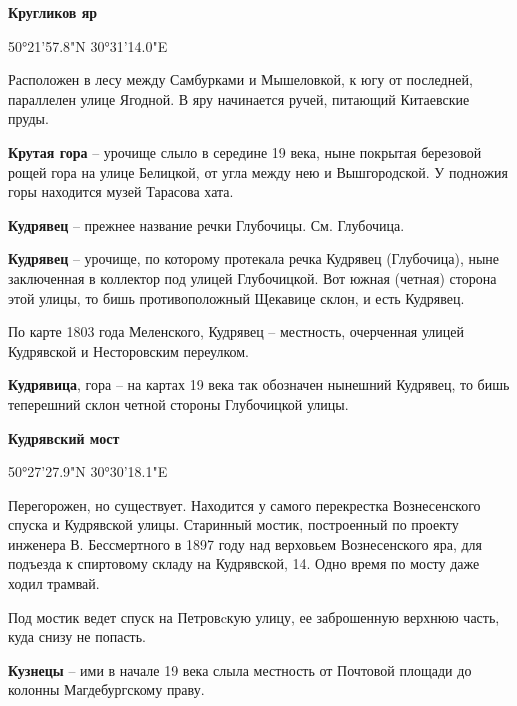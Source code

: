 \medskip

\textbf{Кругликов яр} 

50°21'57.8"N 30°31'14.0"E

Расположен в лесу между Самбурками и Мышеловкой, к югу от последней, параллелен улице Ягодной. В яру начинается ручей, питающий Китаевские пруды.\\

\medskip

\textbf{Крутая гора} – урочище слыло в середине 19 века, ныне покрытая березовой рощей гора на улице Белицкой, от угла между нею и Вышгородской. У подножия горы находится музей Тарасова хата.\\

\medskip

\textbf{Кудрявец} – прежнее название речки Глубочицы. См. Глубочица.\\


\medskip

\textbf{Кудрявец} – урочище, по которому протекала речка Кудрявец (Глубочица), ныне заключенная в коллектор под улицей Глубочицкой. Вот южная (четная) сторона этой улицы, то бишь противоположный Щекавице склон, и есть Кудрявец.

По карте 1803 года Меленского, Кудрявец – местность, очерченная улицей Кудрявской и Несторовским переулком.\\

\medskip

\textbf{Кудрявица}, гора – на картах 19 века так обозначен нынешний Кудрявец, то бишь теперешний склон четной стороны Глубочицкой улицы.\\


\medskip

\textbf{Кудрявский мост}

50°27'27.9"N 30°30'18.1"E

Перегорожен, но существует. Находится у самого перекрестка Вознесенского спуска и Кудрявской улицы. Старинный мостик, построенный по проекту инженера В. Бессмертного в 1897 году над верховьем Вознесенского яра, для подъезда к спиртовому складу на Кудрявской, 14. Одно время по мосту даже ходил трамвай.

Под мостик ведет спуск на Петровcкую улицу, ее заброшенную верхнюю часть, куда снизу не попасть.\\

\medskip


\textbf{Кузнецы} – ими в начале 19 века слыла местность от Почтовой площади до колонны Магдебургскому праву.\\

